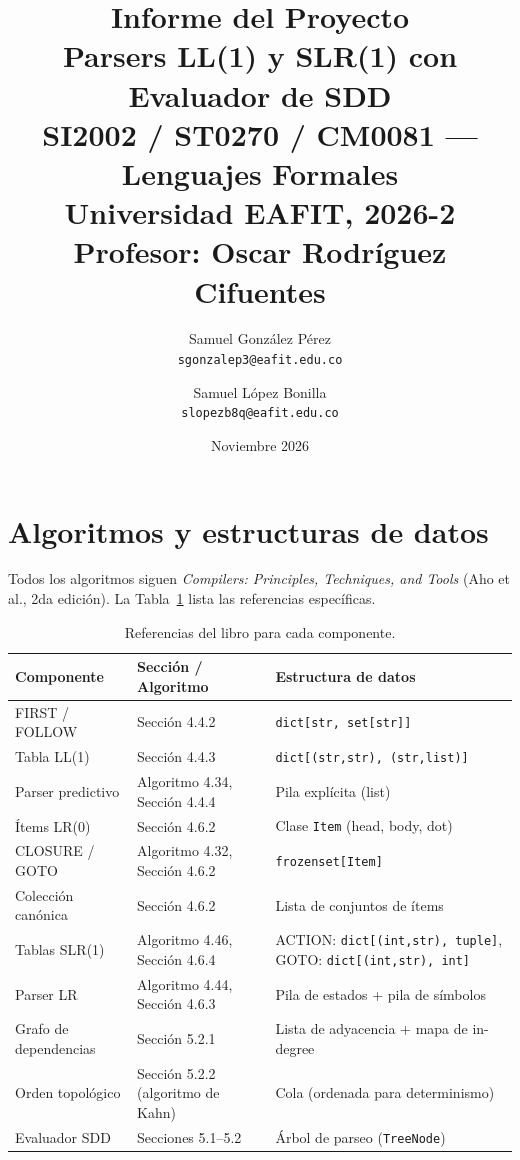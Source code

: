 \documentclass[11pt,a4paper]{article}
\title{%
  \textbf{Informe del Proyecto}\\[6pt]
  \large Parsers LL(1) y SLR(1) con Evaluador de SDD\\[4pt]
  \normalsize SI2002 / ST0270 / CM0081 --- Lenguajes Formales\\
  Universidad EAFIT, 2026-2\\
  Profesor: Oscar Rodr\'iguez Cifuentes
}
\author{
  Samuel Gonz\'alez P\'erez\\
  \texttt{sgonzalep3@eafit.edu.co}
  \and
  Samuel L\'opez Bonilla\\
  \texttt{slopezb8q@eafit.edu.co}
}
\date{Noviembre 2026}
\begin{document}
\maketitle

\section{Algoritmos y estructuras de datos}
\label{sec:algorithms}

Todos los algoritmos siguen \emph{Compilers: Principles, Techniques, and Tools} (Aho et al., 2da edici\'on). La Tabla~\ref{tab:refs} lista las referencias espec\'ificas.

\begin{table}[h]
\centering
\caption{Referencias del libro para cada componente.}
\label{tab:refs}
\begin{tabular}{@{}lll@{}}
\toprule
\textbf{Componente} & \textbf{Secci\'on / Algoritmo} & \textbf{Estructura de datos} \\
\midrule
FIRST / FOLLOW          & Secci\'on 4.4.2                       & \texttt{dict[str, set[str]]} \\
Tabla LL(1)             & Secci\'on 4.4.3                       & \texttt{dict[(str,str), (str,list)]} \\
Parser predictivo       & Algoritmo 4.34, Secci\'on 4.4.4       & Pila expl\'icita (list) \\
\'Items LR(0)            & Secci\'on 4.6.2                       & Clase \texttt{Item} (head, body, dot) \\
CLOSURE / GOTO          & Algoritmo 4.32, Secci\'on 4.6.2       & \texttt{frozenset[Item]} \\
Colecci\'on can\'onica    & Secci\'on 4.6.2                       & Lista de conjuntos de \'items \\
Tablas SLR(1)           & Algoritmo 4.46, Secci\'on 4.6.4       & ACTION: \texttt{dict[(int,str), tuple]}, GOTO: \texttt{dict[(int,str), int]} \\
Parser LR               & Algoritmo 4.44, Secci\'on 4.6.3       & Pila de estados + pila de s\'imbolos \\
Grafo de dependencias   & Secci\'on 5.2.1                       & Lista de adyacencia + mapa de in-degree \\
Orden topol\'ogico       & Secci\'on 5.2.2 (algoritmo de Kahn)   & Cola (ordenada para determinismo) \\
Evaluador SDD           & Secciones 5.1--5.2                   & \'Arbol de parseo (\texttt{TreeNode}) \\
\bottomrule
\end{tabular}
\end{table}
\end{document}
